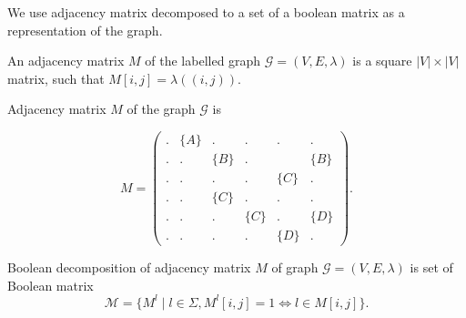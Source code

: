 We use adjacency matrix decomposed to a set of a boolean matrix as a representation of the graph.
\begin{definition}
An adjacency matrix $M$ of the labelled graph $\mathcal{G}=(V, E, \lambda)$ is a square $|V|\times|V|$ matrix, such that $M[i,j] = \lambda((i, j))$.
\end{definition}

Adjacency matrix $M$ of the graph $\mathcal{G}$ is

$$
    M =
    \begin{pmatrix}
    .     & \{A\} &   .   &   .   &   .   &   .   \\
    .     &   .   & \{B\} &   .   &       & \{B\} \\
    .     &   .   &   .   &   .   & \{C\} &   .   \\
    .     &   .   & \{C\} &   .   &   .   &   .   \\
    .     &   .   &   .   & \{C\} &   .   & \{D\} \\
    .     & .     &   .   &   .   & \{D\} &   .
    \end{pmatrix}.
$$

\begin{definition}

Boolean decomposition of adjacency matrix $M$ of graph $\mathcal{G}=(V, E, \lambda)$ is set of Boolean matrix $$\mathcal{M} = \{M^l \mid l \in \Sigma, M^l[i,j]=1 \iff l \in M[i,j]\}.$$

\end{definition}


